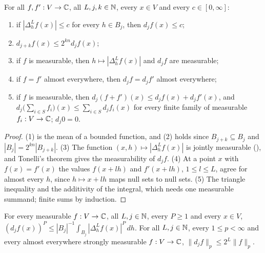 \begin{lemma}
\label{lem:ball-means-basic}
\leanok
{}
For all $f, f' : V \to \mathbb{C}$, all $L, j, k \in \mathbb{N}$, every $x \in V$ and every $c \in [0, \infty]$:
\begin{enumerate}
  \item if $|\Delta^L_h f(x)| \leq c$ for every $h \in B_j$, then $d_j f(x) \leq c$;
  \item $d_{j+k} f(x) \leq 2^{kn} d_j f(x)$;
  \item if $f$ is measurable, then $h \mapsto |\Delta^L_h f(x)|$ and $d_j f$ are measurable;
  \item if $f = f'$ almost everywhere, then $d_j f = d_j f'$ almost everywhere;
  \item if $f$ is measurable, then $d_j(f + f')(x) \leq d_j f(x) + d_j f'(x)$, and
    $d_j \bigl(\sum_{i \in S} f_i\bigr)(x) \leq \sum_{i \in S} d_j f_i(x)$ for every finite
    family of measurable $f_i : V \to \mathbb{C}$; $d_j 0 = 0$.
\end{enumerate}
\end{lemma}

\begin{proof}
\leanok
(1) is the mean of a bounded function, and (2) holds since $B_{j+k} \subseteq B_j$ and
$|B_j| = 2^{kn} |B_{j+k}|$. (3) The function $(x, h) \mapsto |\Delta^L_h f(x)|$ is jointly
measurable (), and Tonelli's theorem gives the measurability of
$d_j f$. (4) At a point $x$ with
$f(x) = f'(x)$ the values $f(x + l h)$ and $f'(x + l h)$, $1 \leq l \leq L$, agree for almost
every $h$, since $h \mapsto x + l h$ maps null sets to null sets. (5) The triangle inequality
and the additivity of the integral, which needs one measurable summand; finite sums by
induction.
\end{proof}

\begin{lemma}
\label{lem:ball-means-lp}
\leanok
{}
For every measurable $f : V \to \mathbb{C}$, all $L, j \in \mathbb{N}$, every $P \geq 1$ and every $x \in V$,
$(d_j f(x))^P \leq |B_j|^{-1} \int_{B_j} |\Delta^L_h f(x)|^P \, dh$. For all $L, j \in \mathbb{N}$,
every $1 \leq p < \infty$ and every almost everywhere strongly measurable $f : V \to \mathbb{C}$,
$\|d_j f\|_p \leq 2^L \|f\|_p$.
\end{lemma}

